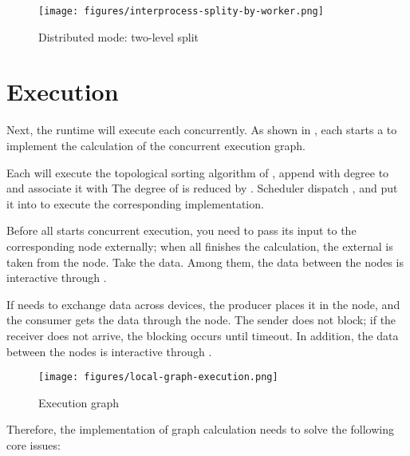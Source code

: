 \begin{figure}[H]
  \centering
  \texttt{[image: figures/interprocess-splity-by-worker.png]}
  \caption{Distributed mode: two-level split}
  \label{fig:interprocess-splity-by-worker}
\end{figure}


\section{Execution}
\label{sec:graph-operation-exec}
Next, the runtime will execute each  concurrently. As shown in , each  starts a  to implement the calculation of the concurrent execution graph.

Each  will execute the topological sorting algorithm of , append  with degree  to  and associate it with The degree of  is reduced by . Scheduler dispatch , and put it into  to execute the corresponding  implementation.

Before all  starts concurrent execution, you need to pass its input to the corresponding  node externally; when all  finishes the calculation, the external is taken from the  node. Take the data. Among them, the data between the  nodes is interactive through .

If  needs to exchange data across devices, the producer places it in the  node, and the consumer gets the data through the  node. The sender does not block; if the receiver does not arrive, the blocking occurs until timeout. In addition, the data between the  nodes is interactive through .

\begin{figure}[H]
  \centering
  \texttt{[image: figures/local-graph-execution.png]}
  \caption{Execution graph}
  \label{fig:local-graph-execution}
\end{figure}

Therefore, the implementation of graph calculation needs to solve the following  core issues:

\begin{enum}
\end{enum}



